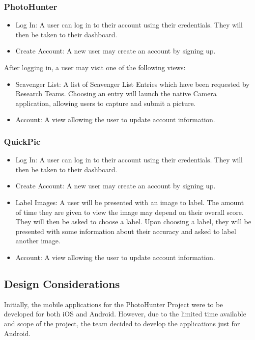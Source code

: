 \documentclass{article}
\begin{document}
\subsubsection{PhotoHunter}

\begin{itemize}
  \item Log In: A user can log in to their account using their credentials.
        They will then be taken to their dashboard.
  \item Create Account: A new user may create an account by signing up.
\end{itemize}

After logging in, a user may visit one of the following views:

\begin{itemize}
  \item Scavenger List: A list of Scavenger List Entries which have been
        requested by Research Teams. Choosing an entry will launch the native Camera
        application, allowing users to capture and submit a picture.
  \item Account: A view allowing the user to update account information.
\end{itemize}

\subsubsection{QuickPic}

\begin{itemize}
  \item Log In: A user can log in to their account using their credentials. They will then be taken to their dashboard.
  \item Create Account: A new user may create an account by signing up.
\end{itemize}

\begin{itemize}
  \item Label Images: A user will be presented with an image to label.  The
    amount of time they are given to view the image may depend on their overall
    score.  They will then be asked to choose a label.  Upon choosing a label,
    they will be presented with some information about their accuracy and asked
    to label another image.
  \item Account: A view allowing the user to update account information.
\end{itemize}
\subsection{Design Considerations}
Initially, the mobile applications for the PhotoHunter Project were to be
developed for both iOS and Android. However, due to the limited time available
and scope of the project, the team decided to develop the applications just for
Android.
\end{document}
